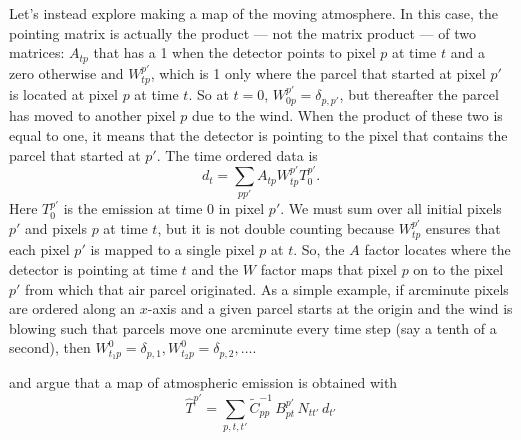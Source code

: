 \documentclass[12pt]{article}
\newcommand\be{\begin{equation}}
\newcommand\ee{\end{equation}}
\begin{document}
Let's instead explore making a map of the moving atmosphere. In this case, the pointing matrix is actually the product --- not the matrix product --- of two matrices: $A_{tp}$ that has a 1 when the detector points to pixel $p$ at time $t$ and a zero otherwise and $W^{p'}_{tp}$, which is 1 only where the parcel that started at pixel $p'$ is located at pixel $p$ at time $t$. So at $t=0$, $W^{p'}_{0p}=\delta_{p,p'}$, but thereafter the parcel has moved to another pixel $p$ due to the wind. When the product of these two is equal to one, it means that the detector is pointing to the pixel that contains the parcel that started at $p'$. 
The time ordered data is
\be
d_t = \sum_{pp'} A_{tp} W^{p'}_{tp}T^{p'}_0.\ee
Here $T^{p'}_0$ is the emission at time 0 in pixel $p'$. We must sum over all initial pixels $p'$ and pixels $p$ at time $t$, but it is not double counting because $W^{p'}_{tp}$ ensures that each pixel $p'$ is mapped to a single pixel $p$ at $t$. So, the $A$ factor locates where the detector is pointing at time $t$ and the $W$ factor maps that pixel $p$ on to the pixel $p'$ from which that air parcel originated. As a simple example, if arcminute pixels are ordered along an $x$-axis and a given parcel starts at the origin and the wind is blowing such that parcels move one arcminute every time step (say a tenth of a second), then $W^{0}_{t_1p}=\delta_{p,1}, W^{0}_{t_2p}=\delta_{p,2},\ldots$. 

and argue that a map of atmospheric emission is obtained with
\be
\hat T^{p'} = \sum_{p,t,t'} \tilde C^{-1}_{pp}\, B^{p'}_{pt} \, N_{tt'}\, d_{t'} \ee
\end{document}
